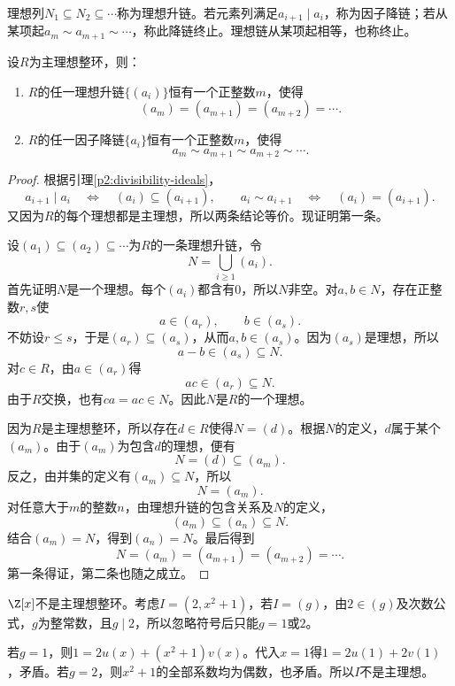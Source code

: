 \begin{definition}
理想列$N_1\subseteq N_2\subseteq\cdots$称为理想升链。若元素列满足$a_{i+1}\mid a_i$，称为因子降链；若从某项起$a_m\sim a_{m+1}\sim\cdots$，称此降链终止。理想链从某项起相等，也称终止。
\end{definition}

\begin{lemma}\label{p2:pid-acc}
设$R$为主理想整环，则：
\begin{enumerate}
\item $R$的任一理想升链$\{(a_i)\}$恒有一个正整数$m$，使得
\[
(a_m)=(a_{m+1})=(a_{m+2})=\cdots.
\]
\item $R$的任一因子降链$\{a_i\}$恒有一个正整数$m$，使得
\[
a_m\sim a_{m+1}\sim a_{m+2}\sim\cdots.
\]
\end{enumerate}
\end{lemma}
\begin{proof}
根据引理\ref{p2:divisibility-ideals}，
\[
a_{i+1}\mid a_i
\quad\Longleftrightarrow\quad
(a_i)\subseteq(a_{i+1}),
\qquad
 a_i\sim a_{i+1}
\quad\Longleftrightarrow\quad
(a_i)=(a_{i+1}).
\]
又因为$R$的每个理想都是主理想，所以两条结论等价。现证明第一条。

设$(a_1)\subseteq(a_2)\subseteq\cdots$为$R$的一条理想升链，令
\[
N=\bigcup\limits_{i\ge1}(a_i).
\]
首先证明$N$是一个理想。每个$(a_i)$都含有$0$，所以$N$非空。对$a,b\in N$，存在正整数$r,s$使
\[
a\in(a_r),\qquad b\in(a_s).
\]
不妨设$r\le s$，于是$(a_r)\subseteq(a_s)$，从而$a,b\in(a_s)$。因为$(a_s)$是理想，所以
\[
a-b\in(a_s)\subseteq N.
\]
对$c\in R$，由$a\in(a_r)$得
\[
ac\in(a_r)\subseteq N.
\]
由于$R$交换，也有$ca=ac\in N$。因此$N$是$R$的一个理想。

因为$R$是主理想整环，所以存在$d\in R$使得$N=(d)$。根据$N$的定义，$d$属于某个$(a_m)$。由于$(a_m)$为包含$d$的理想，便有
\[
N=(d)\subseteq(a_m).
\]
反之，由并集的定义有$(a_m)\subseteq N$，所以
\[
N=(a_m).
\]
对任意大于$m$的整数$n$，由理想升链的包含关系及$N$的定义，
\[
(a_m)\subseteq(a_n)\subseteq N.
\]
结合$(a_m)=N$，得到$(a_n)=N$。最后得到
\[
N=(a_m)=(a_{m+1})=(a_{m+2})=\cdots.
\]
第一条得证，第二条也随之成立。
\end{proof}

\begin{example}
$\Z[x]$不是主理想整环。考虑$I=(2,x^2+1)$，若$I=(g)$，由$2\in(g)$及次数公式，$g$为整常数，且$g\mid2$，所以忽略符号后只能$g=1$或$2$。

若$g=1$，则$1=2u(x)+(x^2+1)v(x)$。代入$x=1$得$1=2u(1)+2v(1)$，矛盾。若$g=2$，则$x^2+1$的全部系数均为偶数，也矛盾。所以$I$不是主理想。
\end{example}

